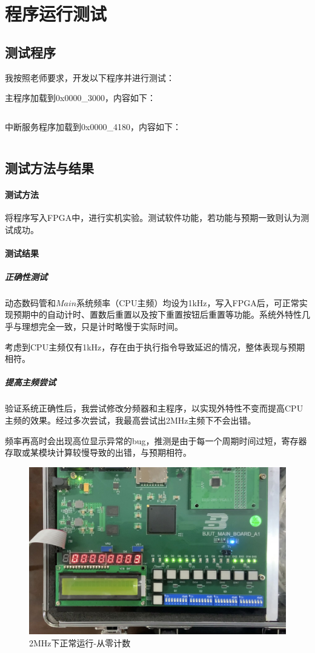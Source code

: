 \documentclass[main.tex]{subfiles}
\begin{document}
\section{程序运行测试}

\subsection{测试程序}
我按照老师要求，开发以下程序并进行测试：

主程序加载到0x0000\_3000，内容如下：
\inputminted[linenos]{gas}{Project4/p3-test-main-commented.asm}

中断服务程序加载到0x0000\_4180，内容如下：
\inputminted[linenos]{gas}{Project4/p3-test-int-commented.asm}

\clearpage

\subsection{测试方法与结果}

\paragraph{测试方法}
将程序写入FPGA中，进行实机实验。测试软件功能，若功能与预期一致则认为测试成功。

\paragraph{测试结果}

\subparagraph{正确性测试} 动态数码管和$Main$系统频率（CPU主频）均设为1kHz，写入FPGA后，可正常实现预期中的自动计时、置数后重置以及按下重置按钮后重置等功能。系统外特性几乎与理想完全一致，只是计时略慢于实际时间。

考虑到CPU主频仅有1kHz，存在由于执行指令导致延迟的情况，整体表现与预期相符。

\subparagraph{提高主频尝试} 验证系统正确性后，我尝试修改分频器和主程序，以实现外特性不变而提高CPU主频的效果。经过多次尝试，我最高尝试出2MHz主频下不会出错。

频率再高时会出现高位显示异常的bug，推测是由于每一个周期时间过短，寄存器存取或某模块计算较慢导致的出错，与预期相符。

\begin{figure}[h]
\centering
\includegraphics[width=\textwidth]{images/2MHz-add.jpg}
\caption{2MHz下正常运行-从零计数}
\end{figure}
\end{document}
